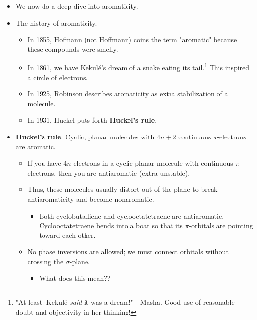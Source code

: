 \documentclass[../notes.tex]{subfiles}
\begin{document}
\begin{itemize}
\begin{itemize}
        \item The model also predicts a ground-state triplet diradical.
        \begin{itemize}
            \item Indeed, this molecule is highly reactive and dimerizes spontaneously at \SI{35}{\kelvin}.
        \end{itemize}
    \end{itemize}
    \item We now do a deep dive into aromaticity.
    \item The history of aromaticity.
    \begin{itemize}
        \item In 1855, Hofmann (not Hoffmann) coins the term "aromatic" because these compounds were smelly.
        \item In 1861, we have Kekul\'{e}'s dream of a snake eating its tail.\footnote{"At least, Kekul\'{e} \emph{said} it was a dream!" - Masha. Good use of reasonable doubt and objectivity in her thinking!} This inspired a circle of electrons.
        \item In 1925, Robinson describes aromaticity as extra stabilization of a molecule.
        \item In 1931, Huckel puts forth \textbf{Huckel's rule}.
    \end{itemize}
    \item \textbf{Huckel's rule}: Cyclic, planar molecules with $4n+2$ continuous $\pi$-electrons are aromatic.
    \begin{itemize}
        \item If you have $4n$ electrons in a cyclic planar molecule with continuous $\pi$-electrons, then you are antiaromatic (extra unstable).
        \item Thus, these molecules usually distort out of the plane to break antiaromaticity and become nonaromatic.
        \begin{itemize}
            \item Both cyclobutadiene and cyclooctatetraene are antiaromatic. Cyclooctatetraene bends into a boat so that its $\pi$-orbitals are pointing toward each other.
        \end{itemize}
        \item No phase inversions are allowed; we must connect orbitals without crossing the $\sigma$-plane.
        \begin{itemize}
            \item What does this mean??
        \end{itemize}

\end{itemize}
\end{itemize}
\end{document}
